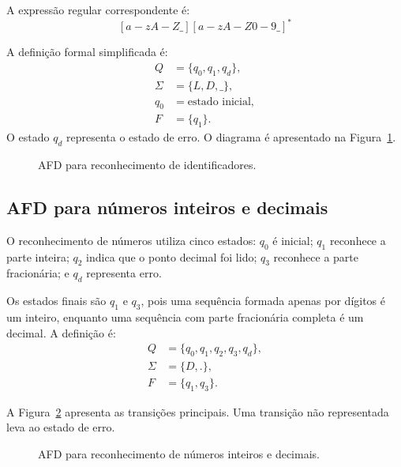 \documentclass[12pt,a4paper]{article}
\begin{document}
A expressão regular correspondente é:
\[
    [a-zA-Z\_][a-zA-Z0-9\_]^*
\]

A definição formal simplificada é:
\[
\begin{aligned}
Q &= \{q_0,q_1,q_d\},\\
\Sigma &= \{L,D,\_\},\\
q_0 &= \text{estado inicial},\\
F &= \{q_1\}.
\end{aligned}
\]
O estado $q_d$ representa o estado de erro. O diagrama é apresentado na
Figura~\ref{fig:afd-identificador}.

\begin{figure}[H]
\centering
{}
\caption{AFD para reconhecimento de identificadores.}
\label{fig:afd-identificador}
\end{figure}

\subsection{AFD para números inteiros e decimais}

O reconhecimento de números utiliza cinco estados: $q_0$ é inicial; $q_1$
reconhece a parte inteira; $q_2$ indica que o ponto decimal foi lido; $q_3$
reconhece a parte fracionária; e $q_d$ representa erro.

Os estados finais são $q_1$ e $q_3$, pois uma sequência formada apenas por
dígitos é um inteiro, enquanto uma sequência com parte fracionária completa
é um decimal. A definição é:
\[
\begin{aligned}
Q &= \{q_0,q_1,q_2,q_3,q_d\},\\
\Sigma &= \{D,.\},\\
F &= \{q_1,q_3\}.
\end{aligned}
\]

A Figura~\ref{fig:afd-numeros} apresenta as transições principais. Uma
transição não representada leva ao estado de erro.

\begin{figure}[H]
\centering
{}
\caption{AFD para reconhecimento de números inteiros e decimais.}
\label{fig:afd-numeros}
\end{figure}
\end{document}

